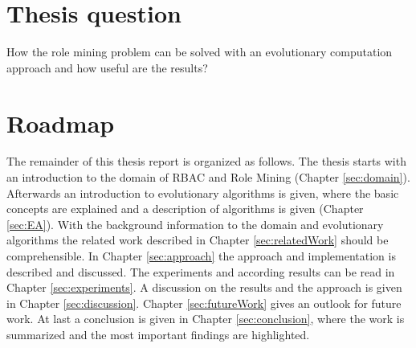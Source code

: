 \section{Thesis question}
How the role mining problem can be solved with an evolutionary computation approach and how useful are the results?

\section{Roadmap}
The remainder of this thesis report is organized as follows. The thesis starts with an introduction to the domain of RBAC and Role Mining (Chapter \ref{sec:domain}). Afterwards an introduction to evolutionary algorithms is given, where the basic concepts are explained and a description of algorithms is given (Chapter \ref{sec:EA}). With the background information to the domain and evolutionary algorithms the related work described in Chapter \ref{sec:relatedWork} should be comprehensible. In Chapter \ref{sec:approach} the approach and implementation is described and discussed. The experiments and according results can be read in Chapter \ref{sec:experiments}. A discussion on the results and the approach is given in Chapter \ref{sec:discussion}. Chapter \ref{sec:futureWork} gives an outlook for future work. At last a conclusion is given in Chapter \ref{sec:conclusion}, where the work is summarized and the most important findings are highlighted.